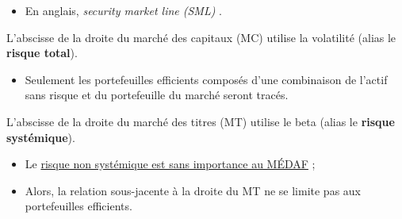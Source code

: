 \documentclass[10pt, french]{article}
\begin{document}
\begin{multicols*}{2}
\begin{definitionNOHFILLsub}
\begin{center}
\end{center}

\begin{itemize}
	\item	En anglais, \og \textit{security market line (SML)} \fg{}.
\end{itemize}

\end{definitionNOHFILLsub}

\begin{rappel_enhanced}
L'abscisse de la droite du marché des capitaux (MC) utilise la volatilité (alias le \textbf{risque total}).
\begin{itemize}
	\item	Seulement les portefeuilles efficients composés d'une combinaison de l'actif sans risque et du portefeuille du marché seront tracés.
\end{itemize}

L'abscisse de la droite du marché des titres (MT) utilise le beta (alias le \textbf{risque systémique}).
\begin{itemize}
	\item	Le \underline{risque non systémique est sans importance au MÉDAF} ;
	\item	Alors, la relation sous-jacente à la droite du MT ne se limite pas aux portefeuilles efficients.
\end{itemize}
\end{rappel_enhanced}



\end{multicols*}
\end{document}

